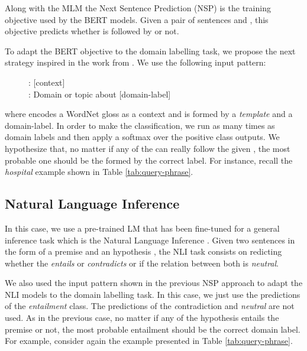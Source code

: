 \documentclass[11pt]{article}
\begin{document}
Along with the MLM the Next Sentence Prediction (NSP) is the training objective used by the BERT models. Given a pair of sentences  and , this objective predicts whether  is followed by  or not.

To adapt the BERT objective to the domain labelling task, we propose the next strategy inspired in the work from . We use the following input pattern:

\begin{figure}[!ht]
    \centering
    \begin{displayquote}
        : [context] \\
        : Domain or topic about [domain-label]
    \end{displayquote}
    \label{fig:nsp_example}
\end{figure}

\noindent where  encodes a WordNet gloss as a context and  is formed by a \textit{template} and a domain-label. In order to make the classification, we run as many times as domain labels and then apply a softmax over the positive class outputs. We hypothesize that, no matter if any of the  can really follow the given , the most probable one should be the  formed by the correct label. For instance, recall the {\it hospital} example shown in Table \ref{tab:query-phrase}.

\subsection{Natural Language Inference}

In this case, we use a pre-trained LM that has been fine-tuned for a general inference task which is the Natural Language Inference \cite{MNLI}. Given two sentences in the form of a premise  and an hypothesis , the NLI task consists on redicting whether the  \textit{entails} or \textit{contradicts}  or if the relation between both is \textit{neutral}. 







We also used the input pattern shown in the previous NSP approach to adapt the NLI models to the domain labelling task. In this case, we just use the predictions of the \textit{entailment} class. The predictions of the {\textit contradiction} and \textit{neutral} are not used. As in the previous case, no matter if any of the  hypothesis entails the premise  or not, the most probable entailment should be the correct domain label. For example, consider again the example presented in Table \ref{tab:query-phrase}.
\end{document}
